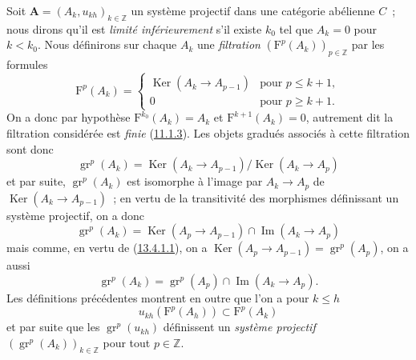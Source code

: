 \begin{env}[13.4.1]
\label{0.13.4.1-fr}
Soit $\mathbf A=(A_k,u_{kh})_{k\in\mathbb Z}$ un système projectif dans une
catégorie abélienne $C$~; nous dirons qu'il est \emph{limité inférieurement}
s'il existe $k_0$ tel que $A_k=0$ pour $k<k_0$. Nous définirons sur chaque
$A_k$ une \emph{filtration} $(\mathrm F^p(A_k))_{p\in\mathbb Z}$ par les
formules
\begin{equation}
\label{0.13.4.1.1-fr}
\tag{13.4.1.1}
\mathrm F^p(A_k)=
\begin{cases}
\operatorname{Ker}(A_k\longrightarrow A_{p-1})&\text{pour }p\leq k+1,\\
0&\text{pour }p\geq k+1.
\end{cases}
\end{equation}
On a donc par hypothèse
$\mathrm F^{k_0}(A_k)=A_k$ et $\mathrm F^{k+1}(A_k)=0$, autrement dit la
filtration considérée est \emph{finie}
(\hyperref[0.11.1.3-fr]{11.1.3}). Les objets gradués associés à cette
filtration sont donc
\[
\operatorname{gr}^p(A_k)=
\operatorname{Ker}(A_k\longrightarrow A_{p-1})
/\operatorname{Ker}(A_k\longrightarrow A_p)
\]
et par suite, $\operatorname{gr}^p(A_k)$ est isomorphe à l'image par
$A_k\to A_p$ de $\operatorname{Ker}(A_k\to A_{p-1})$~; en vertu de la
transitivité des morphismes définissant un système projectif, on a donc
\begin{equation}
\label{0.13.4.1.2-fr}
\tag{13.4.1.2}
\operatorname{gr}^p(A_k)=
\operatorname{Ker}(A_p\longrightarrow A_{p-1})
\cap\operatorname{Im}(A_k\longrightarrow A_p)
\end{equation}
mais comme, en vertu de
(\hyperref[0.13.4.1.1-fr]{13.4.1.1}), on a
$\operatorname{Ker}(A_p\to A_{p-1})=\operatorname{gr}^p(A_p)$, on a aussi
\begin{equation}
\label{0.13.4.1.3-fr}
\tag{13.4.1.3}
\operatorname{gr}^p(A_k)=
\operatorname{gr}^p(A_p)\cap\operatorname{Im}(A_k\longrightarrow A_p).
\end{equation}
Les définitions précédentes montrent en outre que l'on a pour $k\leq h$
\[
u_{kh}(\mathrm F^p(A_h))\subset\mathrm F^p(A_k)
\]
et par suite que les $\operatorname{gr}^p(u_{kh})$ définissent un
\emph{système projectif}
$(\operatorname{gr}^p(A_k))_{k\in\mathbb Z}$ pour tout $p\in\mathbb Z$.
\end{env}

